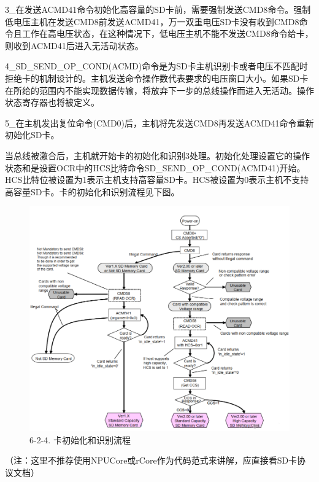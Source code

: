 3_在发送ACMD41命令初始化高容量的SD卡前，需要强制发送CMD8命令。强制低电压主机在发送CMD8前发送ACMD41，万一双重电压SD卡没有收到CMD8命令且工作在高电压状态，在这种情况下，低电压主机不能不发送CMD8命令给卡，则收到ACMD41后进入无活动状态。

4_SD_SEND_OP_COND(ACMD)命令是为SD卡主机识别卡或者电压不匹配时拒绝卡的机制设计的。主机发送命令操作数代表要求的电压窗口大小。如果SD卡在所给的范围内不能实现数据传输，将放弃下一步的总线操作而进入无活动。操作状态寄存器也将被定义。

5_在主机发出复位命令(CMD0)后，主机将先发送CMD8再发送ACMD41命令重新初始化SD卡。

当总线被激合后，主机就开始卡的初始化和识别3处理。初始化处理设置它的操作状态和是设置OCR中的HCS比特命令SD_SEND_OP_COND(ACMD41)开始。HCS比特位被设置为1表示主机支持高容量SD卡。HCS被设置为0表示主机不支持高容量SD卡。卡的初始化和识别流程见下图。
\begin{figure}[H]
    \centering
    \includegraphics{figures/06-02-初始化.png}
    \caption{6-2-4. 卡初始化和识别流程}
\end{figure}
（注：这里不推荐使用NPUCore或rCore作为代码范式来讲解，应直接看SD卡协议文档）

